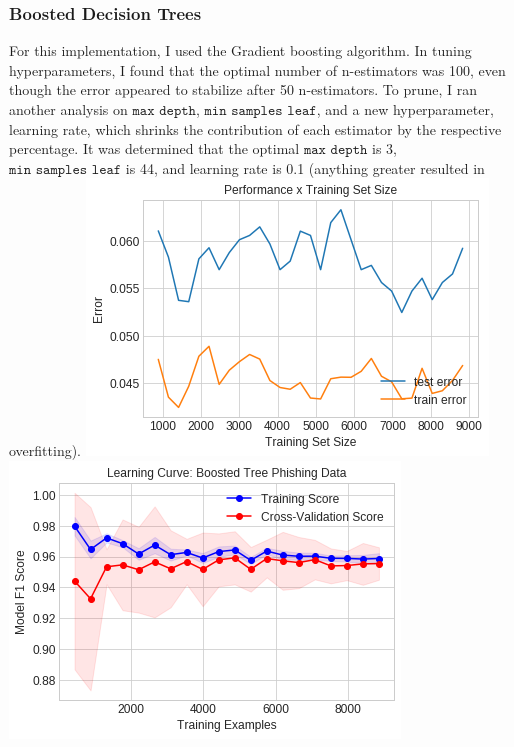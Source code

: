 \documentclass[11pt, a4paper]{article} %
\begin{document}
\subsubsection{Boosted Decision Trees}
For this implementation, I used the Gradient boosting algorithm. In tuning hyperparameters, I found that the optimal number of n-estimators was 100, even though the error appeared to stabilize after 50 n-estimators. To prune, I ran another analysis on $\texttt{max depth}$, $\texttt{min samples leaf}$, and a new hyperparameter, learning rate, which shrinks the contribution of each estimator by the respective percentage. It was determined that the optimal $\texttt{max depth}$ is 3, $\texttt{min samples leaf}$ is 44, and learning rate is 0.1 (anything greater resulted in overfitting).
\newline
\includegraphics[scale=0.55]{Boosted_LC.png}
\includegraphics[scale=0.55]{Boosted_Learning_Curve.png}
\end{document}
